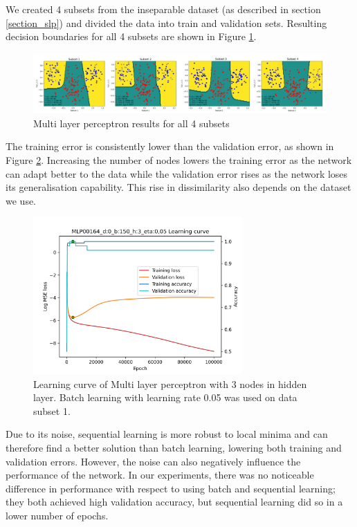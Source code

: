 \documentclass[a4paper]{article}
\begin{document}
We created 4 subsets from the inseparable dataset (as described in section \ref{section_slp}) and divided the data into train and validation sets. Resulting decision boundaries for all 4 subsets are shown in Figure \ref{fig:d1234}.

\begin{figure}[h!]
	\centering
	\includegraphics[width=12.5cm]{img/d1234.png}
	\caption{Multi layer perceptron results for all 4 subsets}
	\label{fig:d1234}
\end{figure}

The training error is consistently lower than the validation error, as shown in Figure \ref{fig:learning_curve}. Increasing the number of nodes lowers the training error as the network can adapt better to the data while the validation error rises as the network loses its generalisation capability. This rise in dissimilarity also depends on the dataset we use.

\begin{figure}[h!]
	\centering
	\includegraphics[width=8cm]{img/MLP00164_d:0_b:150_h:3_eta:0,05_learning_curve.png}
	\caption{Learning curve of Multi layer perceptron with 3 nodes in hidden layer. Batch learning with learning rate 0.05 was used on data subset 1.}
	\label{fig:learning_curve}
\end{figure}

Due to its noise, sequential learning is more robust to local minima and can therefore find a better solution than batch learning, lowering both training and validation errors. However, the noise can also negatively influence the performance of the network. In our experiments, there was no noticeable difference in performance with respect to using batch and sequential learning; they both achieved high validation accuracy, but sequential learning did so in a lower number of epochs. %
\end{document}
